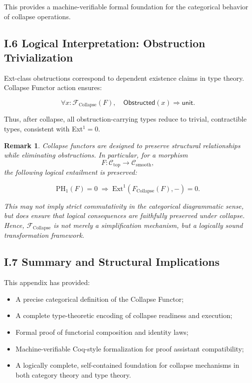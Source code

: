 \documentclass[11pt]{article}
\newtheorem{remark}[theorem]{Remark}
\begin{document}
This provides a machine-verifiable formal foundation for the categorical behavior of collapse operations.

\subsection*{I.6 Logical Interpretation: Obstruction Trivialization}

Ext-class obstructions correspond to dependent existence claims in type theory. Collapse Functor action ensures:

\[
\forall x : \mathcal{F}_{\mathrm{Collapse}}(F), \quad \mathsf{Obstructed}(x) \Rightarrow \mathsf{unit}.
\]

Thus, after collapse, all obstruction-carrying types reduce to trivial, contractible types, consistent with Ext$^1 = 0$.

\begin{remark}
Collapse functors are designed to preserve structural relationships while eliminating obstructions. In particular, for a morphism
\[
F : \mathcal{C}_{\mathrm{top}} \to \mathcal{C}_{\mathrm{smooth}},
\]
the following logical entailment is preserved:

\[
\mathrm{PH}_1(F) = 0 \;\Longrightarrow\; \mathrm{Ext}^1(F_{\mathrm{Collapse}}(F), -) = 0.
\]

This may not imply strict commutativity in the categorical diagrammatic sense, but does ensure that logical consequences are faithfully preserved under collapse. Hence, \( \mathcal{F}_{\mathrm{Collapse}} \) is not merely a simplification mechanism, but a logically sound transformation framework.
\end{remark}


\subsection*{I.7 Summary and Structural Implications}

This appendix has provided:

\begin{itemize}
    \item A precise categorical definition of the Collapse Functor;
    \item A complete type-theoretic encoding of collapse readiness and execution;
    \item Formal proof of functorial composition and identity laws;
    \item Machine-verifiable Coq-style formalization for proof assistant compatibility;
    \item A logically complete, self-contained foundation for collapse mechanisms in both category theory and type theory.
\end{itemize}
\end{document}
